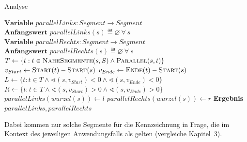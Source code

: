 \documentclass[../main/thesis.tex]{subfiles}
\begin{document}
\begin{algorithmhere}{Analyse}
\label{alg:Analyse}
\begin{algorithmic}
\State $\textbf{Variable } parallelLinks : Segment \rightarrow Segment$
\State $\textbf{Anfangswert } parallelLinks(s) \eqdef \varnothing\ \forall\ s$
\State $\textbf{Variable } parallelRechts : Segment \rightarrow Segment$
\State $\textbf{Anfangswert } parallelRechts(s) \eqdef \varnothing\ \forall\ s$
		\State $T \gets \{t : t \in \textproc{NaheSegmente}(s, S) \wedge \textproc{Parallel}(s, t)\}$  %
		\State $v_{Start} \gets \textproc{Start}(t) - \textproc{Start}(s)$
		\State $v_{Ende} \gets \textproc{Ende}(t) - \textproc{Start}(s)$
		\State $L \gets \{t : t \in T \wedge \sphericalangle (s, v_{Start}) < 0 \wedge \sphericalangle (s, v_{Ende}) < 0\}$
		\State $R \gets \{t : t \in T \wedge \sphericalangle (s, v_{Start}) > 0 \wedge \sphericalangle (s, v_{Ende}) > 0\}$
		\State{}
		\State{}
				\State $parallelLinks(wurzel(s)) \gets l$
			\EndIf
		\EndFor
				\State $parallelRechts(wurzel(s)) \gets r$
			\EndIf
		\EndFor
	\EndFor
	\State \textbf{Ergebnis} $parallelLinks, parallelRechts$
\EndFunction
\end{algorithmic}
\end{algorithmhere}


Dabei kommen nur solche Segmente für die Kennzeichnung in Frage, die im Kontext des jeweiligen Anwendungsfalls als  gelten (vergleiche Kapitel~3).
\end{document}

